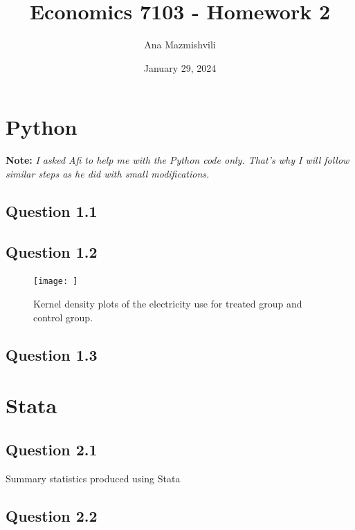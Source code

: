 \documentclass{article}
\title{Economics 7103 - Homework 2}
\author{Ana Mazmishvili}
\date{ January 29, 2024 }
\begin{document}
  
\maketitle 

\section*{Python}
\textbf{Note:} \textit{I asked Afi to help me with the Python code only. That's why I will follow similar steps as he did with small modifications. }

\subsection*{Question 1.1}




\subsection*{Question 1.2}

\begin{figure}[ht]
    \centering
    \texttt{[image: ]}
    \caption{Kernel density plots of the electricity use for treated group and control group.}
    \label{fig:samplehist}
\end{figure}

\subsection*{Question 1.3}

\section*{Stata}

\subsection*{Question 2.1}


\begin{table}[ht]
    \centering
    
    \caption{Summary statistics produced using Stata}
    \label{tab:my_label}
\end{table}

\subsection*{Question 2.2}
\end{document}
